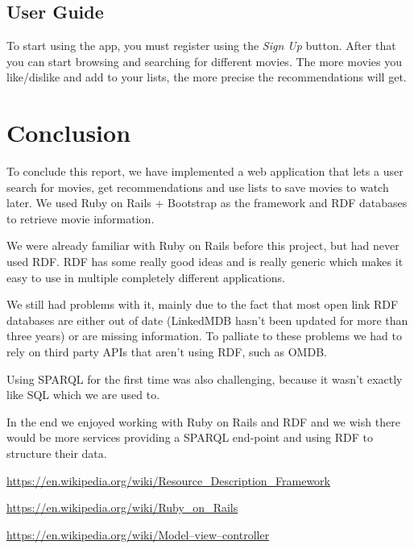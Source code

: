 \documentclass[12pt,a4paper]{article}
\begin{document}
\subsection{User Guide}
To start using the app, you must register using the \textit{Sign Up} button. After that you can start browsing and searching for different movies. The more movies you like/dislike and add to your lists, the more precise the recommendations will get.


\section{Conclusion}
To conclude this report, we have implemented a web application that lets a user search for movies, get recommendations and use lists to save movies to watch later. We used Ruby on Rails + Bootstrap as the framework and RDF databases to retrieve movie information.

We were already familiar with Ruby on Rails before this project, but had never used RDF. RDF has some really good ideas and is really generic which makes it easy to use in multiple completely different applications. 

We still had problems with it, mainly due to the fact that most open link RDF databases are either out of date (LinkedMDB hasn't been updated for more than three years) or are missing information. To palliate to these problems we had to rely on third party APIs that aren't using RDF, such as OMDB.

Using SPARQL for the first time was also challenging, because it wasn't exactly like SQL which we are used to.

In the end we enjoyed working with Ruby on Rails and RDF and we wish there would be more services providing a SPARQL end-point and using RDF to structure their data.




\newpage
\begin{thebibliography}{20}

\href{https://en.wikipedia.org/wiki/Resource\_Description\_Framework}{https://en.wikipedia.org/wiki/Resource\_Description\_Framework}

\href{https://en.wikipedia.org/wiki/Ruby\_on\_Rails}{https://en.wikipedia.org/wiki/Ruby\_on\_Rails}

\href{https://en.wikipedia.org/wiki/Model\%E2\%80\%93view\%E2\%80\%93controller}{https://en.wikipedia.org/wiki/Model–view–controller}
\end{thebibliography}
\end{document}
